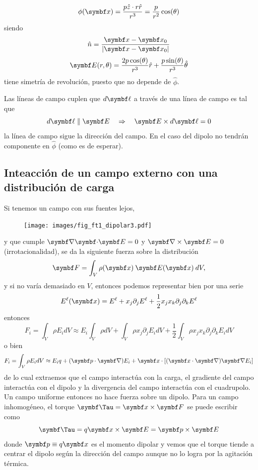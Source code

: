 \documentclass[10pt,oneside]{CBFT_book}
\begin{document}
\[
	\phi(\vb{x}) = \frac{p\hat{z}\cdot r\hat{r}}{r^3} = \frac{p}{r^2} \cos(\theta)
\]
siendo 
\[
	\hat{n} = \frac{\vb{x}-\vb{x}_0}{|\vb{x}-\vb{x}_0|}
\]
\[
	\vb{E}(r,\theta) = \frac{2 p\cos(\theta)}{r^3} \hat{r} + \frac{p\sin(\theta)}{r^3} \hat{\theta}
\]
tiene simetría de revolución, puesto que no depende de $\hat{\phi}$.

Las líneas de campo cuplen que $d\vb{\ell}$ a través de una línea de campo es tal que 
\[
	d\vb{\ell} \parallel \vb{E} \quad \Rightarrow \quad  \vb{E} \times d\vb{\ell}  = 0
\]
la línea de campo sigue la dirección del campo. En el caso del dipolo no tendrán componente en
$\hat{\phi}$ (como es de esperar).

\subsection{Inteacción de un campo externo con una distribución de carga}

Si tenemos un campo  con sus fuentes lejos,

\begin{figure}[htb]
	\begin{center}
	\texttt{[image: images/fig\_ft1\_dipolar3.pdf]}	 
	\end{center}
	\caption{}
\end{figure}

y que cumple $\divem{E}=0$ y $\rotorm{E}=0$ (irrotacionalidad), se da la siguiente fuerza sobre la distribución
\[
	\vb{F} = \int_V \rho(\vb{x}) \: \vb{E}(\vb{x}) \: dV,
\]
y si  no varía demasiado en $V$, entonces podemos representar bien por una serie
\[
	E^\ell(\vb{x}) = E^\ell + x_j \partial_j E^\ell + \frac{1}{2} x_j x_k \partial_j\partial_k E^\ell
\]
entonces 
\[
	F_i = \int_V \rho E_i dV \approx E_i \int_V \rho dV + \int_V \rho  x_j \partial_j E_i dV +
		\frac{1}{2} \int_V \rho x_j x_k \partial_j\partial_k E_i dV 
\]
o bien 
\[
	F_i = \int_V \rho E_i dV \approx E_i q + (\vb{p}\cdot\Nabla) E_i  +
		\vb{x}\cdot\left[ (\vb{x}\cdot\Nabla)\Nabla E_i\right]
\]
de lo cual extraemos que el campo interactúa con la carga, el gradiente del campo interactúa con el dipolo
y la divergencia del campo interactúa con el cuadrupolo.
Un campo uniforme entonces no hace fuerza sobre un dipolo.
Para un campo inhomogéneo, el torque $\vb{\Tau} = \vb{x} \times \vb{F}$ se puede escribir como 
\[
	\vb{\Tau} = q\vb{x} \times \vb{E} = \vb{p} \times \vb{E}
\]
donde $\vb{p}\equiv q\vb{x}$ es el momento dipolar y vemos que el torque tiende a centrar el dipolo
según la dirección del campo  aunque no lo logra por la agitación térmica.
\end{document}
